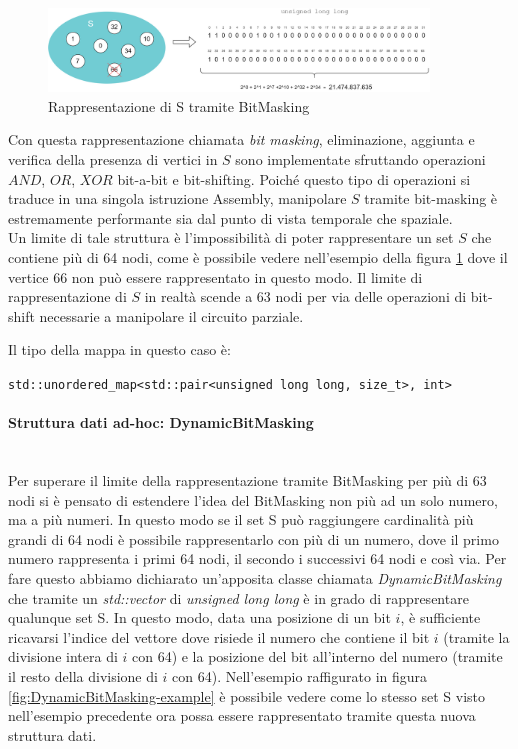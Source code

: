 \begin{figure}[h]
	\centering
	\includegraphics[width=0.9\textwidth]{./images/BitMasking Example.png}
	\caption{Rappresentazione di S tramite BitMasking}
	\label{fig:bitmasking-example}
\end{figure}

\noindent Con questa rappresentazione chiamata \textit{bit masking}, eliminazione, aggiunta e verifica della presenza di vertici in $S$ sono implementate sfruttando operazioni $AND$, $OR$, $XOR$ bit-a-bit e bit-shifting.
Poiché questo tipo di operazioni si traduce in una singola istruzione Assembly, manipolare $S$ tramite bit-masking è estremamente performante sia dal punto di vista temporale che spaziale. \\

\noindent Un limite di tale struttura è l'impossibilità di poter rappresentare un set $S$ che contiene più di 64 nodi, come è possibile vedere nell'esempio della figura \ref{fig:bitmasking-example} dove il vertice 66 non può essere rappresentato in questo modo. Il limite di rappresentazione di $S$ in realtà scende a 63 nodi per via delle operazioni di bit-shift necessarie a manipolare il circuito parziale.

\noindent Il tipo della mappa in questo caso è:

\begin{center}
    \texttt{std::unordered_map<std::pair<unsigned long long, size_t>, int>}
\end{center}

\paragraph{Struttura dati ad-hoc: DynamicBitMasking}\mbox{} \\

Per superare il limite della rappresentazione tramite BitMasking per più di 63 nodi si è pensato di estendere l'idea del BitMasking non più ad un solo numero, ma a più numeri. In questo modo se il set S può raggiungere cardinalità più grandi di 64 nodi è possibile rappresentarlo con più di un numero, dove il primo numero rappresenta i primi 64 nodi, il secondo i successivi 64 nodi e così via. Per fare questo abbiamo dichiarato un'apposita classe chiamata \textit{DynamicBitMasking} che tramite un \textit{std::vector} di \textit{unsigned long long} è in grado di rappresentare qualunque set S. In questo modo, data una posizione di un bit $i$, è sufficiente ricavarsi l'indice del vettore dove risiede il numero che contiene il bit $i$ (tramite la divisione intera di $i$ con 64) e la posizione del bit all'interno del numero (tramite il resto della divisione di $i$ con 64). Nell'esempio raffigurato in figura \ref{fig:DynamicBitMasking-example} è possibile vedere come lo stesso set S visto nell'esempio precedente ora possa essere rappresentato tramite questa nuova struttura dati.

